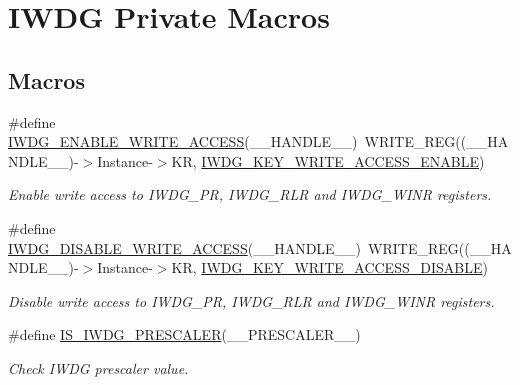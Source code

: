 \hypertarget{group___i_w_d_g___private___macros}{}\section{I\+W\+DG Private Macros}
\label{group___i_w_d_g___private___macros}
\subsection*{Macros}
\begin{DoxyCompactItemize}
\item 
\#define \hyperlink{group___i_w_d_g___private___macros_ga65cf77f3cfd45d3fd66c0cf33d23d7ab}{I\+W\+D\+G\+\_\+\+E\+N\+A\+B\+L\+E\+\_\+\+W\+R\+I\+T\+E\+\_\+\+A\+C\+C\+E\+SS}(\+\_\+\+\_\+\+H\+A\+N\+D\+L\+E\+\_\+\+\_\+)~W\+R\+I\+T\+E\+\_\+\+R\+EG((\+\_\+\+\_\+\+H\+A\+N\+D\+L\+E\+\_\+\+\_\+)-\/$>$Instance-\/$>$KR, \hyperlink{group___i_w_d_g___private___constants_ga90fbb0a5e42ed25b44c0330ad75724e6}{I\+W\+D\+G\+\_\+\+K\+E\+Y\+\_\+\+W\+R\+I\+T\+E\+\_\+\+A\+C\+C\+E\+S\+S\+\_\+\+E\+N\+A\+B\+LE})
\begin{DoxyCompactList}\small\item\em Enable write access to I\+W\+D\+G\+\_\+\+PR, I\+W\+D\+G\+\_\+\+R\+LR and I\+W\+D\+G\+\_\+\+W\+I\+NR registers. \end{DoxyCompactList}\item 
\#define \hyperlink{group___i_w_d_g___private___macros_ga31636a55162fc73caf03c2d2808ea9dd}{I\+W\+D\+G\+\_\+\+D\+I\+S\+A\+B\+L\+E\+\_\+\+W\+R\+I\+T\+E\+\_\+\+A\+C\+C\+E\+SS}(\+\_\+\+\_\+\+H\+A\+N\+D\+L\+E\+\_\+\+\_\+)~W\+R\+I\+T\+E\+\_\+\+R\+EG((\+\_\+\+\_\+\+H\+A\+N\+D\+L\+E\+\_\+\+\_\+)-\/$>$Instance-\/$>$KR, \hyperlink{group___i_w_d_g___private___constants_ga9e63bed9af448ad96c4621e74230a415}{I\+W\+D\+G\+\_\+\+K\+E\+Y\+\_\+\+W\+R\+I\+T\+E\+\_\+\+A\+C\+C\+E\+S\+S\+\_\+\+D\+I\+S\+A\+B\+LE})
\begin{DoxyCompactList}\small\item\em Disable write access to I\+W\+D\+G\+\_\+\+PR, I\+W\+D\+G\+\_\+\+R\+LR and I\+W\+D\+G\+\_\+\+W\+I\+NR registers. \end{DoxyCompactList}\item 
\#define \hyperlink{group___i_w_d_g___private___macros_ga2b1af237dca5c067fbc9088185cb8185}{I\+S\+\_\+\+I\+W\+D\+G\+\_\+\+P\+R\+E\+S\+C\+A\+L\+ER}(\+\_\+\+\_\+\+P\+R\+E\+S\+C\+A\+L\+E\+R\+\_\+\+\_\+)
\begin{DoxyCompactList}\small\item\em Check I\+W\+DG prescaler value. \end{DoxyCompactList}\item 

\end{DoxyCompactItemize}
